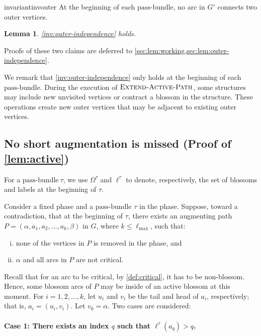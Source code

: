 \documentclass{article}
\newcommand{\alp}{\alpha}
\newcommand{\Omg}{\Omega}
\newcommand{\lmax}{\ell_{\max}}
\newcommand{\bundle}{\text{pass-bundle}\xspace}
\newcommand{\algExtend}{\textsc{Extend-Active-Path}\xspace}
\newtheorem{lemma}[theorem]{Lemma}
\begin{document}
\begin{restatable}{invariant}{invouter}
\label{inv:outer-independence} At the beginning of each $\bundle$, no arc in $G'$ connects two outer vertices.    
\end{restatable}

\begin{lemma}
\label{lem:outer-independence} 
\cref{inv:outer-independence} holds.
\end{lemma}
Proofs of these two claims are deferred to \cref{sec:lem:working,sec:lem:outer-independence}.

We remark that \cref{inv:outer-independence} only holds at the beginning of each $\bundle$. During the execution of $\algExtend$, some structures may include new unvisited vertices or contract a blossom in the structure. These operations create new outer vertices that may be adjacent to existing outer vertices.

\subsection{No short augmentation is missed (Proof of \cref{lem:active})}

For a $\bundle\ \tau$, we use $\Omg^\tau$ and $\ell^\tau$ to denote, respectively, the set of blossoms and labels at the beginning of $\tau$.

Consider a fixed phase and a $\bundle$ $\tau$ in the phase.
Suppose, toward a contradiction, that at the beginning of $\tau$, there exists an augmenting path $P = (\alp, a_1, a_2, \dots, a_k, \beta)$ in $G$, where $k \leq \lmax$, such that:
\begin{enumerate}[(i)]
    \item none of the vertices in $P$ is removed in the phase, and
    \item $\alp$ and all arcs in $P$ are not critical. 
\end{enumerate}
Recall that for an arc to be critical, by \cref{def:critical}, it has to be non-blossom. Hence, some blossom arcs of $P$ may be inside of an active blossom at this moment.
For $i = 1, 2, \dots, k$, let $u_i$ and $v_i$ be the tail and head of $a_i$, respectively; that is, $a_i = (u_i, v_i)$.
Let $v_0 = \alp$.
Two cases are considered:



\paragraph{Case 1: There exists an index $q$ such that $\ell^{\tau}(a_q) > q$.}   
\end{document}
